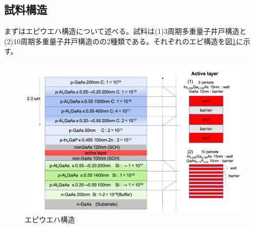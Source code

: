 \subsection{試料構造}%
まずはエピウエハ構造について述べる。試料は(1)3周期多重量子井戸構造と(2)10周期多重量子井戸構造のの2種類である。それぞれのエピ構造を図\ref{fig:fig_2_1_wafer_structure}に示す。

\begin{figure}[t]
	\centering
	\includegraphics[width=15cm]{figure/fig_2_1_wafer_structure}
	\caption{エピウエハ構造}
	\label{fig:fig_2_1_wafer_structure}
\end{figure}
\newpage
\clearpage
